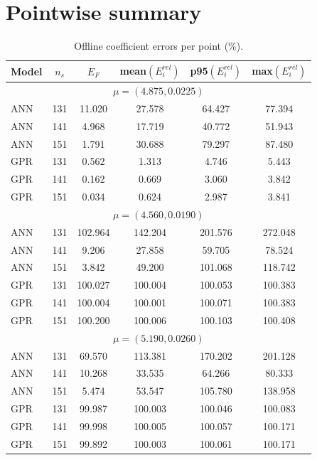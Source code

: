 \documentclass[11pt]{article}
\begin{document}
\section*{Pointwise summary}
\begin{table}[H]
\centering
\caption{Offline coefficient errors per point (\%).}
\begin{tabular}{lccccc}
\toprule
Model & $n_s$ & $E_F$ & mean$(E_i^{rel})$ & p95$(E_i^{rel})$ & max$(E_i^{rel})$ \\
\midrule
\multicolumn{6}{c}{\(\mu=(4.875,0.0225)\)} \\
\midrule
ANN & 131 & 11.020 & 27.578 & 64.427 & 77.394 \\
ANN & 141 & 4.968 & 17.719 & 40.772 & 51.943 \\
ANN & 151 & 1.791 & 30.688 & 79.297 & 87.480 \\
GPR & 131 & 0.562 & 1.313 & 4.746 & 5.443 \\
GPR & 141 & 0.162 & 0.669 & 3.060 & 3.842 \\
GPR & 151 & 0.034 & 0.624 & 2.987 & 3.841 \\
\midrule
\multicolumn{6}{c}{\(\mu=(4.560,0.0190)\)} \\
\midrule
ANN & 131 & 102.964 & 142.204 & 201.576 & 272.048 \\
ANN & 141 & 9.206 & 27.858 & 59.705 & 78.524 \\
ANN & 151 & 3.842 & 49.200 & 101.068 & 118.742 \\
GPR & 131 & 100.027 & 100.004 & 100.053 & 100.383 \\
GPR & 141 & 100.004 & 100.001 & 100.071 & 100.383 \\
GPR & 151 & 100.200 & 100.006 & 100.103 & 100.408 \\
\midrule
\multicolumn{6}{c}{\(\mu=(5.190,0.0260)\)} \\
\midrule
ANN & 131 & 69.570 & 113.381 & 170.202 & 201.128 \\
ANN & 141 & 10.268 & 33.535 & 64.266 & 80.333 \\
ANN & 151 & 5.474 & 53.547 & 105.780 & 138.958 \\
GPR & 131 & 99.987 & 100.003 & 100.046 & 100.083 \\
GPR & 141 & 99.998 & 100.005 & 100.057 & 100.171 \\
GPR & 151 & 99.892 & 100.003 & 100.061 & 100.171 \\
\midrule
\bottomrule
\end{tabular}
\end{table}
\end{document}
